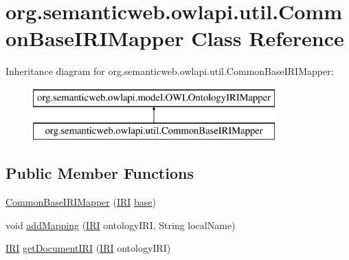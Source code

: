 \hypertarget{classorg_1_1semanticweb_1_1owlapi_1_1util_1_1_common_base_i_r_i_mapper}{\section{org.\-semanticweb.\-owlapi.\-util.\-Common\-Base\-I\-R\-I\-Mapper Class Reference}
\label{classorg_1_1semanticweb_1_1owlapi_1_1util_1_1_common_base_i_r_i_mapper}
}
Inheritance diagram for org.\-semanticweb.\-owlapi.\-util.\-Common\-Base\-I\-R\-I\-Mapper\-:\begin{figure}[H]
\begin{center}
\leavevmode
\includegraphics[height=2.000000cm]{classorg_1_1semanticweb_1_1owlapi_1_1util_1_1_common_base_i_r_i_mapper}
\end{center}
\end{figure}
\subsection*{Public Member Functions}
\begin{DoxyCompactItemize}
\item 
\hyperlink{classorg_1_1semanticweb_1_1owlapi_1_1util_1_1_common_base_i_r_i_mapper_aef0564c7d16a90495036dfa346b5642c}{Common\-Base\-I\-R\-I\-Mapper} (\hyperlink{classorg_1_1semanticweb_1_1owlapi_1_1model_1_1_i_r_i}{I\-R\-I} \hyperlink{classorg_1_1semanticweb_1_1owlapi_1_1util_1_1_common_base_i_r_i_mapper_a3953923f758f75e26e97ad588bf7bfa0}{base})
\item 
void \hyperlink{classorg_1_1semanticweb_1_1owlapi_1_1util_1_1_common_base_i_r_i_mapper_ac9dfa30697118420299539e7fe767663}{add\-Mapping} (\hyperlink{classorg_1_1semanticweb_1_1owlapi_1_1model_1_1_i_r_i}{I\-R\-I} ontology\-I\-R\-I, String local\-Name)
\item 
\hyperlink{classorg_1_1semanticweb_1_1owlapi_1_1model_1_1_i_r_i}{I\-R\-I} \hyperlink{classorg_1_1semanticweb_1_1owlapi_1_1util_1_1_common_base_i_r_i_mapper_aad6f987fa21edda0c92947423a6fe193}{get\-Document\-I\-R\-I} (\hyperlink{classorg_1_1semanticweb_1_1owlapi_1_1model_1_1_i_r_i}{I\-R\-I} ontology\-I\-R\-I)
\end{DoxyCompactItemize}
